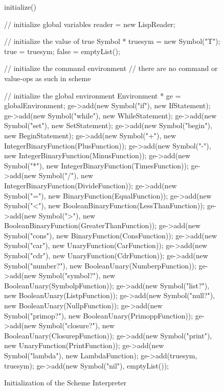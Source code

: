 \begin{figure}
\begin{cprog}
initialize()
{

	// initialize global variables
	reader = new LispReader;

	// initialize the value of true
	Symbol * truesym = new Symbol("T");
	true = truesym;
	false = emptyList();

	// initialize the command environment
	// there are no command or value-ops as such in scheme

	// initialize the global environment
	Environment * ge = globalEnvironment;
	ge->add(new Symbol("if"), new IfStatement);
	ge->add(new Symbol("while"), new WhileStatement);
	ge->add(new Symbol("set"), new SetStatement);
	ge->add(new Symbol("begin"), new BeginStatement);
	ge->add(new Symbol("+"), new IntegerBinaryFunction(PlusFunction));
	ge->add(new Symbol("-"), new IntegerBinaryFunction(MinusFunction));
	ge->add(new Symbol("*"), new IntegerBinaryFunction(TimesFunction));
	ge->add(new Symbol("/"), new IntegerBinaryFunction(DivideFunction));
	ge->add(new Symbol("="), new BinaryFunction(EqualFunction));
	ge->add(new Symbol("<"), new BooleanBinaryFunction(LessThanFunction));
	ge->add(new Symbol(">"), new BooleanBinaryFunction(GreaterThanFunction));
	ge->add(new Symbol("cons"), new BinaryFunction(ConsFunction));
	ge->add(new Symbol("car"), new UnaryFunction(CarFunction));
	ge->add(new Symbol("cdr"), new UnaryFunction(CdrFunction));
	ge->add(new Symbol("number?"), new BooleanUnary(NumberpFunction));
	ge->add(new Symbol("symbol?"), new BooleanUnary(SymbolpFunction));
	ge->add(new Symbol("list?"), new BooleanUnary(ListpFunction));
	ge->add(new Symbol("null?"), new BooleanUnary(NullpFunction));
	ge->add(new Symbol("primop?"), new BooleanUnary(PrimoppFunction));
	ge->add(new Symbol("closure?"), new BooleanUnary(ClosurepFunction));
	ge->add(new Symbol("print"), new UnaryFunction(PrintFunction));
	ge->add(new Symbol("lambda"), new LambdaFunction);
	ge->add(truesym, truesym);
	ge->add(new Symbol("nil"), emptyList());
}
\end{cprog}
\caption{Initialization of the Scheme Interpreter}\label{schemeinit}
\end{figure}

